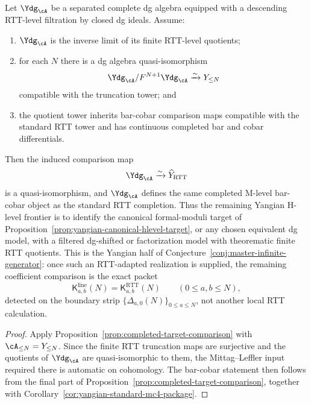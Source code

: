 \begin{corollary}
\label{cor:yangian-hlevel-comparison-criterion}
Let $\Ydg_{\cA}$ be a separated complete dg algebra equipped with a
descending RTT-level filtration by closed dg ideals.  Assume:
\begin{enumerate}
\item $\Ydg_{\cA}$ is the inverse limit of its finite RTT-level
  quotients;
\item for each $N$ there is a dg algebra quasi-isomorphism
  \[
  \Ydg_{\cA}/F^{N+1}\Ydg_{\cA} \xrightarrow{\sim} Y_{\le N}
  \]
  compatible with the truncation tower; and
\item the quotient tower inherits bar-cobar comparison maps compatible
  with the standard RTT tower and has continuous completed bar and cobar
  differentials.
\end{enumerate}
Then the induced comparison map
\[
\Ydg_{\cA} \xrightarrow{\sim} \widehat Y_{\mathrm{RTT}}
\]
is a quasi-isomorphism, and $\Ydg_{\cA}$ defines the same completed
M-level bar-cobar object as the standard RTT completion.  Thus the
remaining Yangian H-level frontier is to identify the canonical
formal-moduli target of
Proposition~\ref{prop:yangian-canonical-hlevel-target}, or any chosen
equivalent dg model, with a filtered dg-shifted or factorization model
with theorematic finite RTT quotients.  This is the Yangian half of
Conjecture~\ref{conj:master-infinite-generator}: once such an
RTT-adapted realization is supplied, the remaining coefficient
comparison is the exact packet
\[
\mathsf{K}^{\mathrm{line}}_{a,b}(N)
=\mathsf{K}^{\mathrm{RTT}}_{a,b}(N)
\qquad (0\le a,b\le N),
\]
detected on the boundary strip
$\{\Delta_{a,0}(N)\}_{0\le a\le N}$, not another local RTT
calculation.
\end{corollary}

\begin{proof}
Apply Proposition~\ref{prop:completed-target-comparison} with
$\cA_{\le N}=Y_{\le N}$.  Since the finite RTT truncation maps are
surjective and the quotients of $\Ydg_{\cA}$ are quasi-isomorphic to
them, the Mittag--Leffler input required there is automatic on
cohomology.  The bar-cobar statement then follows from the final part
of Proposition~\ref{prop:completed-target-comparison}, together with
Corollary~\ref{cor:yangian-standard-mc4-package}.
\end{proof}

